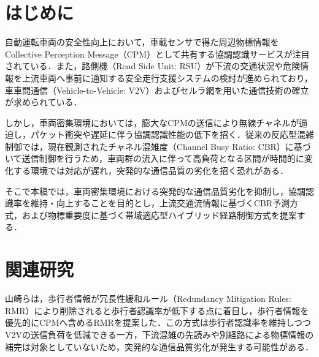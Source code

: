 \documentclass{fitj}
\begin{document}
\maketitle




\section{はじめに}
自動運転車両の安全性向上において，車載センサで得た周辺物標情報をCollective Perception Message（CPM）として共有する協調認識サービスが注目されている．また，路側機（Road Side Unit: RSU）が下流の交通状況や危険情報を上流車両へ事前に通知する安全走行支援システムの検討が進められており\cite{soumu2025}，車車間通信（Vehicle-to-Vehicle: V2V）およびセルラ網を用いた通信技術の確立が求められている． 

しかし，車両密集環境においては，膨大なCPMの送信により無線チャネルが逼迫し，パケット衝突や遅延に伴う協調認識性能の低下を招く．従来の反応型混雑制御では，現在観測されたチャネル混雑度（Channel Busy Ratio: CBR）に基づいて送信制御を行うため\cite{etsidcc}，車両群の流入に伴って高負荷となる区間が時間的に変化する環境では対応が遅れ，突発的な通信品質の劣化を招く恐れがある．

そこで本稿では，車両密集環境における突発的な通信品質劣化を抑制し，協調認識率を維持・向上することを目的とし，上流交通流情報に基づくCBR予測方式，および物標重要度に基づく帯域適応型ハイブリッド経路制御方式を提案する．

\section{関連研究}
山崎らは，歩行者情報が冗長性緩和ルール（Redundancy Mitigation Rules: RMR）により削除されると歩行者認識率が低下する点に着目し，歩行者情報を優先的にCPMへ含めるRMRを提案した\cite{yamasaki2023}．この方式は歩行者認識率を維持しつつV2Vの送信負荷を低減できる一方，下流混雑の先読みや別経路による物標情報の補完は対象としていないため，突発的な通信品質劣化が発生する可能性がある．
\end{document}
